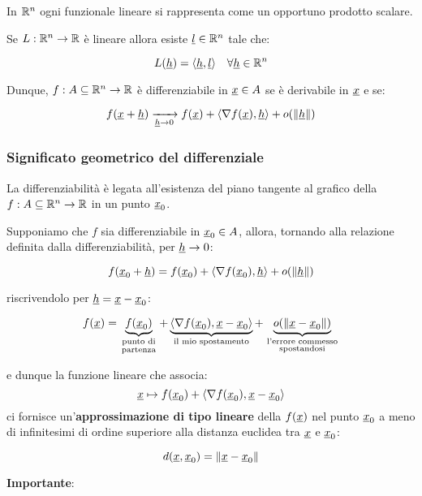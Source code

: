 In \(\mathbb{R}^{n} \) ogni funzionale lineare si rappresenta come un opportuno prodotto scalare.


Se \(L: \mathbb{R}^{n} \rightarrow \mathbb{R} \) è lineare allora esiste \(\underline{l} \in \mathbb{R}^{n} \) tale che:

\[
    L(\underline{h} ) = \langle \underline{h} , \underline{l} \rangle \quad \forall \underline{h} \in \mathbb{R}^{n}
\]

Dunque, \(f: A \subseteq \mathbb{R}^{n} \rightarrow \mathbb{R} \) è differenziabile in \(\underline{x} \in A\) se è derivabile in \(\underline{x} \) e se:

\[
    f(\underline{x} + \underline{h} ) \xrightarrow[\underline{h} \to 0]{} f(\underline{x} ) + \langle \nabla f(\underline{x} ), \underline{h} \rangle + o(\left\lVert\underline{h}\right\rVert)
\]

\subsubsection{Significato geometrico del differenziale}

La differenziabilità è legata all'esistenza del piano tangente al grafico della \(f: A \subseteq \mathbb{R}^{n} \to \mathbb{R} \) in un punto \(\underline{x}_0\).

Supponiamo che \(f\) sia differenziabile in \(\underline{x}_0 \in A \), allora, tornando alla relazione definita dalla differenziabilità, per \(\underline{h} \to 0\):

\[
    f(\underline{x}_0+\underline{h}) = f(\underline{x}_0) +\langle \nabla f(\underline{x}_0) , \underline{h} \rangle  + o(\left\lVert\underline{h}\right\rVert )
\]

riscrivendolo per \(\underline{h} = \underline{x} - \underline{x}_0\):

\[
    f(\underline{x}) = \underbrace{f(\underline{x}_0)}_{\begin{smallmatrix}\text{punto di} \\ \text{partenza}\end{smallmatrix}} + \underbrace{\langle \nabla f(\underline{x}_0), \underline{x}-\underline{x}_0 \rangle}_\text{il mio spostamento} + \underbrace{o(\left\lVert\underline{x}-\underline{x}_0\right\rVert)}_{\begin{smallmatrix}\text{l'errore commesso} \\ \text{spostandosi}\end{smallmatrix}}
\]

e dunque la funzione lineare che associa:
\[\underline{x} \mapsto  f(\underline{x}_0 ) + \langle \nabla f(\underline{x}_0 ), \underline{x}-\underline{x}_0 \rangle \]
ci fornisce un'\textbf{approssimazione di tipo lineare} della \(f(\underline{x})\) nel punto \(\underline{x}_0\) a meno di infinitesimi di ordine superiore alla distanza euclidea tra \(\underline{x} \) e \(\underline{x}_0\):

\[
    d(\underline{x},\underline{x}_0) = \left\lVert\underline{x}-\underline{x}_0\right\rVert
\]

\textbf{Importante}:


